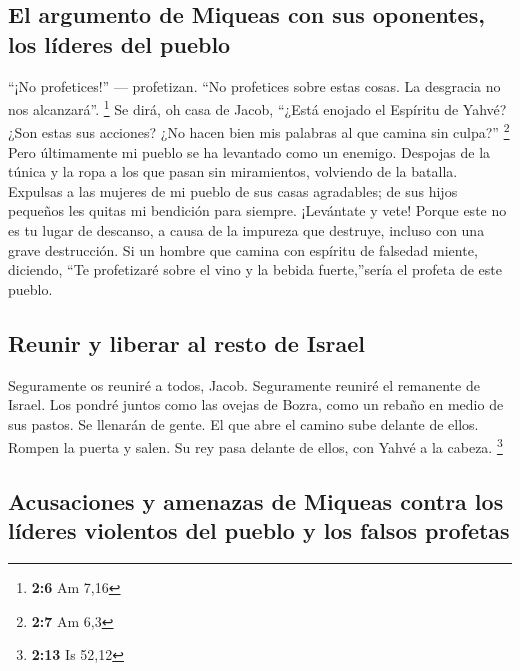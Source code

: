 \hypertarget{el-argumento-de-miqueas-con-sus-oponentes-los-luxedderes-del-pueblo}{%
\subsection{El argumento de Miqueas con sus oponentes, los líderes del
pueblo}\label{el-argumento-de-miqueas-con-sus-oponentes-los-luxedderes-del-pueblo}}

 ``¡No profetices!'' --- profetizan. ``No profetices sobre
estas cosas. La desgracia no nos alcanzará''. \footnote{\textbf{2:6} Am
  7,16}  Se dirá, oh casa de Jacob, ``¿Está enojado el
Espíritu de Yahvé? ¿Son estas sus acciones? ¿No hacen bien mis palabras
al que camina sin culpa?'' \footnote{\textbf{2:7} Am 6,3} 
Pero últimamente mi pueblo se ha levantado como un enemigo. Despojas de
la túnica y la ropa a los que pasan sin miramientos, volviendo de la
batalla.  Expulsas a las mujeres de mi pueblo de sus casas
agradables; de sus hijos pequeños les quitas mi bendición para siempre.
 ¡Levántate y vete! Porque este no es tu lugar de
descanso, a causa de la impureza que destruye, incluso con una grave
destrucción.  Si un hombre que camina con espíritu de
falsedad miente, diciendo, ``Te profetizaré sobre el vino y la bebida
fuerte,''sería el profeta de este pueblo.

\hypertarget{reunir-y-liberar-al-resto-de-israel}{%
\subsection{Reunir y liberar al resto de
Israel}\label{reunir-y-liberar-al-resto-de-israel}}

 Seguramente os reuniré a todos, Jacob. Seguramente
reuniré el remanente de Israel. Los pondré juntos como las ovejas de
Bozra, como un rebaño en medio de sus pastos. Se llenarán de gente.
 El que abre el camino sube delante de ellos. Rompen la
puerta y salen. Su rey pasa delante de ellos, con Yahvé a la cabeza.
\footnote{\textbf{2:13} Is 52,12}

\hypertarget{acusaciones-y-amenazas-de-miqueas-contra-los-luxedderes-violentos-del-pueblo-y-los-falsos-profetas}{%
\subsection{Acusaciones y amenazas de Miqueas contra los líderes
violentos del pueblo y los falsos
profetas}\label{acusaciones-y-amenazas-de-miqueas-contra-los-luxedderes-violentos-del-pueblo-y-los-falsos-profetas}}

